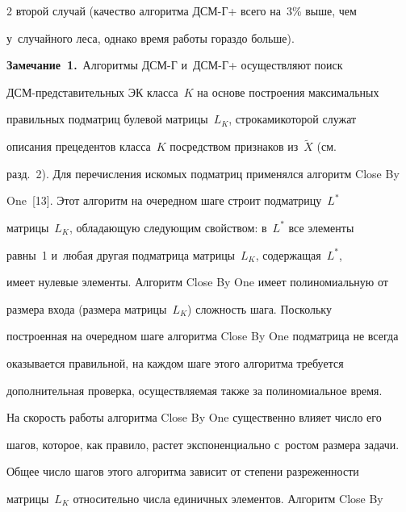 \begin{multicols}{2}
второй случай (качество алгоритма ДСМ-Г+ всего на~3\% выше, чем 


у~случайного леса, однако время работы гораздо больше).


  


  \smallskip


  





  


  \noindent


  \textbf{Замечание~1.}\ Алгоритмы ДСМ-Г и~ДСМ-Г+ осуществляют поиск 


ДСМ-представительных ЭК класса~$K$ на основе построения максимальных 


правильных подматриц булевой матрицы~$L_K$, строками\linebreak которой служат 


описания прецедентов класса~$K$ посредством признаков из~$\tilde{X}$ (см.\ 


разд.~2). Для пе\-ре\-чис\-ле\-ния искомых под\-мат\-риц применялся алгоритм Close By 


One~[13]. Этот алгоритм на очередном шаге строит под\-мат\-ри\-цу~$L^*$ 


матрицы~$L_K$, обладающую следующим свойством: в~$L^*$ все элементы 


равны~1 и~любая другая подматрица матрицы~$L_K$, содержащая~$L^*$, 


имеет нулевые элементы. Алгоритм Close By One имеет полиномиальную от 


размера входа (размера мат\-ри\-цы~$L_K$) слож\-ность шага. Поскольку 


по\-стро\-ен\-ная на очередном шаге алгоритма Close By One под\-мат\-ри\-ца не всегда 


оказывается правильной, на каждом шаге этого алгоритма требуется 


дополнительная проверка, осуществляемая также за полиномиальное время. 


  


  На скорость работы алгоритма Close By One существенно влияет число его 


шагов, которое, как правило, растет экспоненциально с~ростом размера задачи. 


Общее число шагов этого алгоритма зависит от степени разреженности 


матрицы~$L_K$ относительно числа единичных элементов. Алгоритм Close By 



\end{multicols}
